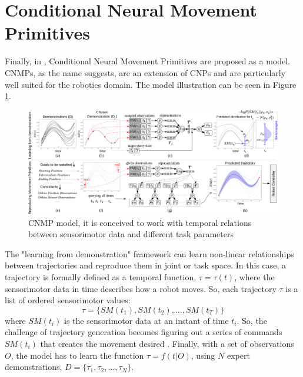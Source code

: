 \section{Conditional Neural Movement Primitives}
Finally, in \cite{Ugur-RSS-19}, Conditional Neural Movement Primitives are proposed as a model. CNMPs, as the name suggests, are an extension of CNPs and are particularly well suited for the robotics domain. The model illustration can be seen in Figure \ref{fig:cnmp}.  
\begin{figure}
	\centering
	\includegraphics[width=0.99\linewidth]{Images/CNMP.png}
	\caption{CNMP model, it is conceived to work with temporal relations between sensorimotor data and different task parameters}
	\label{fig:cnmp}
\end{figure}
The "learning from demonstration" framework can learn non-linear relationships between trajectories and reproduce them in joint or task space. In this case, a trajectory is formally defined as a temporal function, $\tau = \tau (t)$, where the sensorimotor data in time describes how a robot moves. So, each trajectory $\tau$ is a list of ordered sensorimotor values: 
\begin{equation}
    \tau = \{ SM(t_1), SM(t_2), ... , SM(t_T ) \}
\end{equation}
where $SM(t_i)$ is the sensorimotor data at an instant of time $t_i$.
So, the challenge of trajectory generation becomes figuring out a series of commands $SM(t_i)$ that creates the movement desired \cite{gasparetto2007new}. 
Finally, with a set of observations $O$, the model has to learn the function $\tau = f(t|O)$, using $N$ expert demonstrations, $D = \{\tau_1, \tau_2, ... , \tau_N \}$. 

